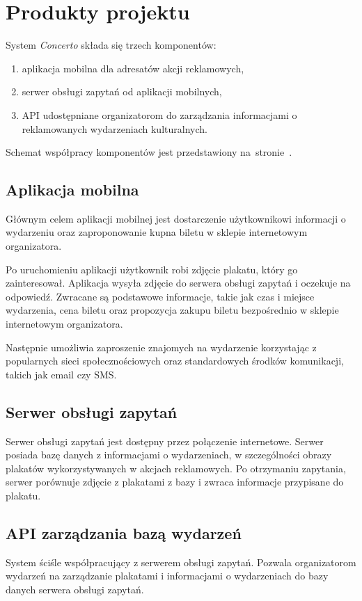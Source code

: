 \newpage
\section{Produkty projektu}
\label{sec:produkty}

System \emph{Concerto} składa się trzech komponentów:
\begin{enumerate}[nosep]
    \item aplikacja mobilna dla adresatów akcji reklamowych,
    \item serwer obsługi zapytań od aplikacji mobilnych,
    \item API udostępniane organizatorom do zarządzania informacjami o
        reklamowanych wydarzeniach kulturalnych.
\end{enumerate}
Schemat współpracy komponentów jest przedstawiony
na~stronie~\pageref{fig:produkty:schemat_wspolpracy}.

\subsection{Aplikacja mobilna}
Głównym celem aplikacji mobilnej jest dostarczenie użytkownikowi informacji o
wydarzeniu oraz zaproponowanie kupna biletu w sklepie internetowym organizatora.

Po uruchomieniu aplikacji użytkownik robi zdjęcie plakatu, który go
zainteresował. Aplikacja wysyła zdjęcie do serwera obsługi zapytań i oczekuje na
odpowiedź. Zwracane są podstawowe informacje, takie jak czas i miejsce
wydarzenia, cena biletu oraz propozycja zakupu biletu bezpośrednio w sklepie
internetowym organizatora.

Następnie umożliwia zaproszenie znajomych na wydarzenie korzystając z
popularnych sieci społecznościowych oraz standardowych środków komunikacji,
takich jak email czy SMS.

\subsection{Serwer obsługi zapytań}
Serwer obsługi zapytań jest dostępny przez połączenie internetowe. Serwer
posiada bazę danych z informacjami o wydarzeniach, w szczególności obrazy
plakatów wykorzystywanych w akcjach reklamowych. Po otrzymaniu zapytania,
serwer porównuje zdjęcie z plakatami z bazy i zwraca informacje przypisane do
plakatu.

\subsection{API zarządzania bazą wydarzeń}
System ściśle współpracujący z serwerem obsługi zapytań. Pozwala organizatorom
wydarzeń na zarządzanie plakatami i informacjami o wydarzeniach do bazy danych
serwera obsługi zapytań.

